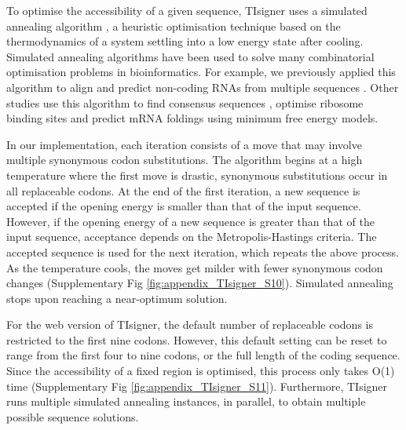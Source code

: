 To optimise the accessibility of a given sequence, TIsigner uses a simulated annealing algorithm \cite{Kirkpatrick1983-hh,Ingber2000-aw,Keith2002-jx,Brownlee2011-bk}, a heuristic optimisation technique based on the thermodynamics of a system settling into a low energy state after cooling. Simulated annealing algorithms have been used to solve many combinatorial optimisation problems in bioinformatics. For example, we previously applied this algorithm to align and predict non-coding RNAs from multiple sequences \cite{Lindgreen2007-jy}. Other studies use this algorithm to find consensus sequences \cite{Keith2002-jx}, optimise ribosome binding sites \cite{Salis2009-dh} and predict mRNA foldings \cite{Gaspar2013-bg} using minimum free energy models.


In our implementation, each iteration consists of a move that may involve multiple synonymous codon substitutions. The algorithm begins at a high temperature where the first move is drastic, synonymous substitutions occur in all replaceable codons. At the end of the first iteration, a new sequence is accepted if the opening energy is smaller than that of the input sequence. However, if the opening energy of a new sequence is greater than that of the input sequence, acceptance depends on the Metropolis-Hastings criteria. The accepted sequence is used for the next iteration, which repeats the above process. As the temperature cools, the moves get milder with fewer synonymous codon changes (Supplementary Fig \ref{fig:appendix_TIsigner_S10}). Simulated annealing stops upon reaching a near-optimum solution. 

For the web version of TIsigner, the default number of replaceable codons is restricted to the first nine codons. However, this default setting can be reset to range from the first four to nine codons, or the full length of the coding sequence. Since the accessibility of a fixed region is optimised, this process only takes O(1) time (Supplementary Fig \ref{fig:appendix_TIsigner_S11}). Furthermore, TIsigner runs multiple simulated annealing instances, in parallel, to obtain multiple possible sequence solutions.

